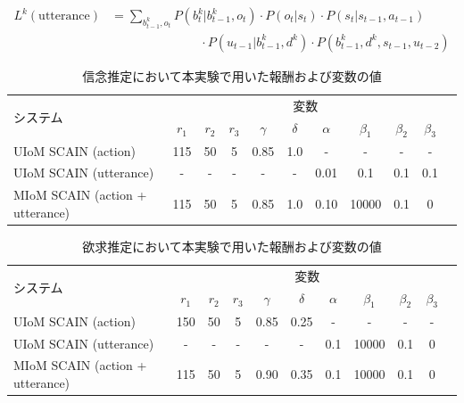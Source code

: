 \begin{equation}
  \begin{split}
  \label{uiom_u}
  L^k({\mathrm{utterance}})&= \sum_{b_{t-1}^k,o_t}P(b_t^k|b_{t-1}^k,o_t)\cdot P(o_t|s_t)\cdot P(s_t|s_{t-1},a_{t-1})\\
  &\hspace{3cm}\cdot P(u_{t-1}|b_{t-1}^k,d^k)\cdot P(b_{t-1}^k,d^k,s_{t-1},u_{t-2})
  \end{split}
\end{equation}

\begin{table}[htb]
  \begin{center}
  \caption{信念推定において本実験で用いた報酬および変数の値}
  \label{b_params}
  \begin{tabular}{lcccccccccc} \hline
    \multirow{2}{*}{システム}&\multicolumn{9}{c}{変数}\\\cline{2-10}
    & $r_1$& $r_2$&$r_3$&$\gamma$&$\delta$&$\alpha$&$\beta_1$&$\beta_2$&$\beta_3$\\ \hline
    UIoM SCAIN (action)&115&50&5&0.85&1.0&-&-&-&-\\
    UIoM SCAIN (utterance)&-&-&-&-&-&0.01&0.1&0.1&0.1\\
    MIoM SCAIN (action + utterance)&115&50&5&0.85&1.0&0.10&10000&0.1&0\\\hline
  \end{tabular}
\end{center}
\end{table}

\begin{table}[htb]
  \begin{center}
  \caption{欲求推定において本実験で用いた報酬および変数の値}
  \label{d_params}
  \begin{tabular}{lcccccccccc} \hline
    \multirow{2}{*}{システム}&\multicolumn{9}{c}{変数}\\\cline{2-10}
    & $r_1$& $r_2$&$r_3$&$\gamma$&$\delta$&$\alpha$&$\beta_1$&$\beta_2$&$\beta_3$\\ \hline
    UIoM SCAIN (action)&150&50&5&0.85&0.25&-&-&-&-\\
    UIoM SCAIN (utterance)&-&-&-&-&-&0.1&10000&0.1&0\\
    MIoM SCAIN (action + utterance)&115&50&5&0.90&0.35&0.1&10000&0.1&0\\\hline
  \end{tabular}
\end{center}
\end{table}

